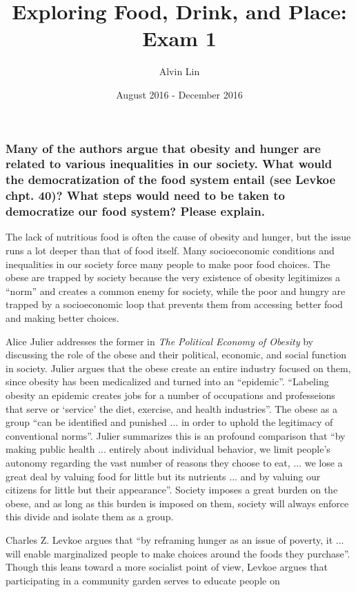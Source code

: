 \documentclass[letterpaper, 12pt]{article}
\title{Exploring Food, Drink, and Place: Exam 1}
\author{Alvin Lin}
\date{August 2016 - December 2016}
\begin{document}
\maketitle

\subsubsection*{Many of the authors argue that obesity and hunger are related
to various inequalities in our society. What would the democratization of the
food system entail (see Levkoe chpt. 40)? What steps would need to be taken to
democratize our food system? Please explain.}
The lack of nutritious food is often the cause of obesity and hunger, but the
issue runs a lot deeper than that of food itself. Many socioeconomic conditions
and inequalities in our society force many people to make poor food choices.
The obese are trapped by society because the very existence of obesity
legitimizes a ``norm'' and creates a common enemy for society, while the poor
and hungry are trapped by a socioeconomic loop that prevents them from
accessing better food and making better choices. \par
Alice Julier addresses the former in \textit{The Political Economy of Obesity}
by discussing the role of the obese and their political, economic, and social
function in society. Julier argues that the obese create an entire industry
focused on them, since obesity has been medicalized and turned into an
``epidemic''. ``Labeling obesity an epidemic creates jobs for a number of
occupations and professeions that serve or `service' the diet, exercise, and
health industries''. The obese as a group ``can be identified and punished ...
in order to uphold the legitimacy of conventional norms''. Julier summarizes
this is an profound comparison that ``by making public health ... entirely about
individual behavior, we limit people's autonomy regarding the vast number of
reasons they choose to eat, ... we lose a great deal by valuing food for little
but its nutrients ... and by valuing our citizens for little but their
appearance''. Society imposes a great burden on the obese, and as long
as this burden is imposed on them, society will always enforce this divide and
isolate them as a group. \par
Charles Z. Levkoe argues that ``by reframing hunger as an issue of poverty, it
... will enable marginalized people to make choices around the foods they
purchase''. Though this leans toward a more socialist point of view, Levkoe
argues that participating in a community garden serves to educate people on
\end{document}
